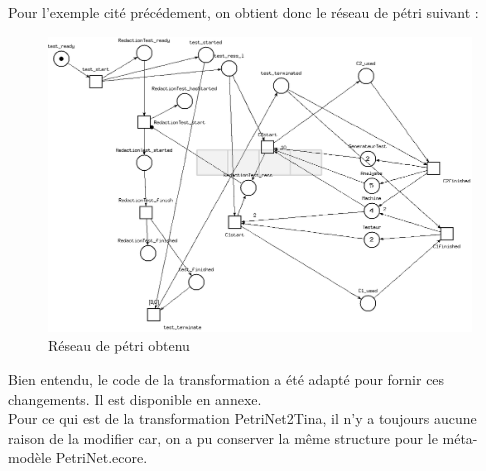 Pour l'exemple cité précédement, on obtient donc le réseau de pétri suivant :\\

\begin{figure}[!h] 
\begin{center}
\includegraphics[width=15cm]{Capture-16.png}
\caption{Réseau de pétri obtenu} 
\label{img1} 
\end{center}
\end{figure}

Bien entendu, le code de la transformation a été adapté pour fornir ces changements. Il est disponible en annexe.\\

Pour ce qui est de la transformation PetriNet2Tina, il n'y a toujours aucune raison de la modifier car, on a pu conserver la même structure pour le méta-modèle PetriNet.ecore.\\







